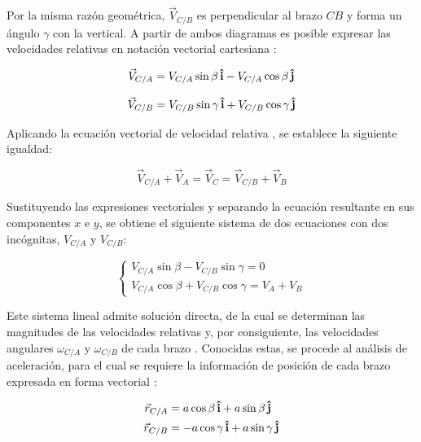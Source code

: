 Por la misma razón geométrica, $\vec{V}_{C/B}$ es perpendicular al brazo $CB$
y forma un ángulo $\gamma$ con la vertical. A partir de ambos diagramas es
posible expresar las velocidades relativas en notación vectorial cartesiana
\cite{hibbeler2016}:

\begin{equation*}
    \vec{V}_{C/A} = V_{C/A}\sin\beta\,\mathbf{\hat{i}} - V_{C/A}\cos\beta\,\mathbf{\hat{j}}
\end{equation*}

\begin{equation*}
    \vec{V}_{C/B} = V_{C/B}\sin\gamma\,\mathbf{\hat{i}} + V_{C/B}\cos\gamma\,\mathbf{\hat{j}}
\end{equation*}

Aplicando la ecuación vectorial de velocidad relativa \cite{meriam2018}, se
establece la siguiente igualdad:

\begin{equation*}
    \vec{V}_{C/A} + \vec{V}_A = \vec{V}_C = \vec{V}_{C/B} + \vec{V}_B
\end{equation*}

Sustituyendo las expresiones vectoriales y separando la ecuación resultante en
sus componentes $x$ e $y$, se obtiene el siguiente sistema de dos ecuaciones
con dos incógnitas, $V_{C/A}$ y $V_{C/B}$:

\begin{equation*}
    \begin{cases}
        V_{C/A}\sin\beta - V_{C/B}\sin\gamma = 0 \\
        V_{C/A}\cos\beta + V_{C/B}\cos\gamma = V_A + V_B
    \end{cases}
\end{equation*}

Este sistema lineal admite solución directa, de la cual se determinan las
magnitudes de las velocidades relativas y, por consiguiente, las velocidades
angulares $\omega_{C/A}$ y $\omega_{C/B}$ de cada brazo \cite{beer2019}.
Conocidas estas, se procede al análisis de aceleración, para el cual se
requiere la información de posición de cada brazo expresada en forma vectorial
\cite{hibbeler2016}:

\begin{align*}
    \vec{r}_{C/A} &= a\cos\beta\,\mathbf{\hat{i}} + a\sin\beta\,\mathbf{\hat{j}}\\
    \vec{r}_{C/B} &= -a\cos\gamma\,\mathbf{\hat{i}} + a\sin\gamma\,\mathbf{\hat{j}}
\end{align*}

